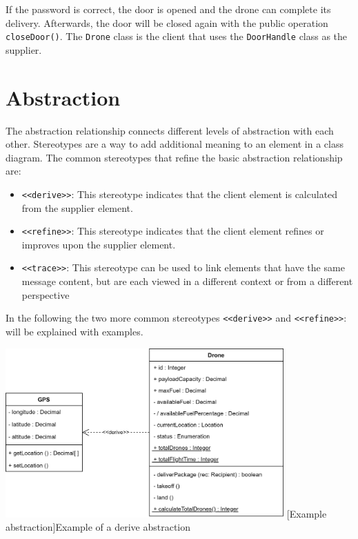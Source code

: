 \documentclass[
	12pt,
    a4paper,
    egregdoesnotlikesansseriftitles, %
    toc=chapterentrywithdots,
    oneside, openany,
    titlepage,
    parskip=half,
    headings=normal,  %
    listof=totoc,
    bibliography=totocnumbered,
    index=totoc,
    captions=tableheading,  %
    listof=flat,
    numbers=noenddot, %
    final]
    {scrbook}
\begin{document}
If the password is correct, the door is opened and the drone can complete its delivery. 
Afterwards, the door will be closed again with the public operation \texttt{closeDoor()}.
The \texttt{Drone} class is the client that uses the \texttt{DoorHandle} class as the supplier.


\section{Abstraction}
The abstraction relationship connects different levels of abstraction with each other.
Stereotypes are a way to add additional meaning to an element in a class diagram. 
The common stereotypes that refine the basic abstraction relationship are: \cite{ibm_dependencies}
\begin{itemize}
	\item \texttt{<<derive>>}: This stereotype indicates that the client element is calculated from the supplier element.
	\item \texttt{<<refine>>}: This stereotype indicates that the client element refines or improves upon the supplier element.
	\item \texttt{<<trace>>}: This stereotype can be used to link elements that have the same message content, but are each viewed in a different context or from a different perspective
\end{itemize}

In the following the two more common stereotypes \texttt{<<derive>>} and \texttt{<<refine>>}: will be explained with examples.

\vspace{1em}
\begin{minipage}{\linewidth}
	\centering
	\includegraphics[width=0.8\textwidth]{figures/dependencies/derive.jpg}
	[Example abstraction]{Example of a derive abstraction}
	\label{fig:derive_example}
\end{minipage}
\end{document}
